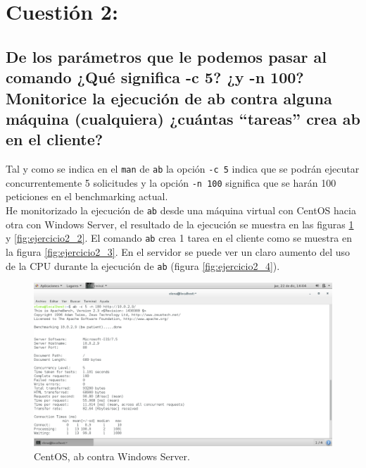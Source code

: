 
\section{Cuestión 2:}

\subsection{De los parámetros que le podemos pasar al comando ¿Qué significa -c 5? ¿y -n 100? Monitorice la ejecución de ab contra alguna máquina (cualquiera) ¿cuántas ``tareas'' crea ab en el cliente?}

Tal y como se indica en el \texttt{man} de \texttt{ab} la opción \texttt{-c 5} indica que se podrán ejecutar concurrentemente 5 solicitudes y la opción \texttt{-n 100} significa que se harán 100 peticiones en el benchmarking actual. \\

He monitorizado la ejecución de \texttt{ab} desde una máquina virtual con CentOS hacia otra con Windows Server, el resultado de la ejecución se muestra en las figuras \ref{fig:ejercicio2_1} y \ref{fig:ejercicio2_2}. El comando \texttt{ab} crea 1 tarea en el cliente como se muestra en la figura \ref{fig:ejercicio2_3}. En el servidor se puede ver un claro aumento del uso de la CPU durante la ejecución de \texttt{ab} (figura \ref{fig:ejercicio2_4}).

\begin{figure}[H] 
	\centering
	\includegraphics[width=14.7cm]{./img/ejercicio2_1.png} 	
	\caption{CentOS, ab contra Windows Server.} \label{fig:ejercicio2_1}
\end{figure}

